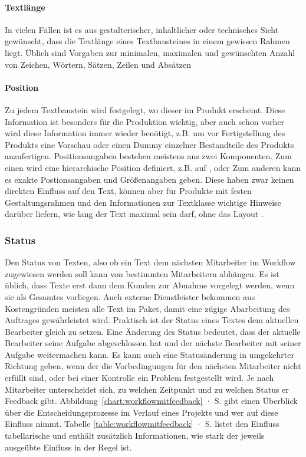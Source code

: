 \paragraph{Textlänge} In vielen Fällen ist es aus gestalterischer, inhaltlicher oder technisches Sicht gewünscht, dass die Textlänge eines Textbausteines in einem gewissen Rahmen liegt. Üblich sind Vorgaben zur minimalen, maximalen und gewünschten Anzahl von Zeichen, Wörtern, Sätzen, Zeilen und Absätzen

\paragraph{Position} Zu jedem Textbaustein wird festgelegt, wo dieser im Produkt erscheint. Diese Information ist besonders für die Produktion wichtig, aber auch schon vorher wird diese Information immer wieder benötigt, z.B. um vor Fertigstellung des Produkts eine Vorschau oder einen Dummy einzelner Bestandteile des Produkts anzufertigen. Positionsangaben bestehen meistens aus zwei Komponenten. Zum einen wird eine hierarchische Position definiert, z.B. auf , oder  Zum anderen kann es exakte Postionsangaben und Größenangaben geben. Diese haben zwar keinen direkten Einfluss auf den Text, können aber für Produkte mit festen Gestaltungsrahmen und den Informationen zur Textklasse wichtige Hinweise darüber liefern, wie lang der Text maximal sein darf, ohne das Layout .

\subsubsection{Status}\label{l:konzept-workflow-status}

Den Status von Texten, also ob ein Text dem nächsten Mitarbeiter im Workflow zugewiesen werden soll kann von bestimmten Mitarbeitern abhängen. Es ist üblich, dass Texte erst dann dem Kunden zur Abnahme vorgelegt werden, wenn sie als Gesamtes vorliegen. Auch externe Dienstleister bekommen aus Kostengründen meisten alle Text im Paket, damit eine zügige Abarbeitung des Auftrages gewährleistet wird. Praktisch ist der Status eines Textes dem aktuellen Bearbeiter gleich zu setzen. Eine Änderung des Status bedeutet, dass der aktuelle Bearbeiter seine Aufgabe abgeschlossen hat und der nächste Bearbeiter mit seiner Aufgabe weitermachen kann. Es kann auch eine Statusänderung in umgekehrter Richtung geben, wenn der die Vorbedingungen für den nächsten Mitarbeiter nicht erfüllt sind, oder bei einer Kontrolle ein Problem festgestellt wird. Je nach Mitarbeiter unterscheidet sich, zu welchen Zeitpunkt und zu welchen Status er Feedback gibt. Abbildung~\ref{chart:workflowmitfeedback} · S.\pageref{chart:workflowmitfeedback} gibt einen Überblick über die Entscheidungsprozesse im Verlauf eines Projekts und wer auf diese Einfluss nimmt. Tabelle \ref{table:workflowmitfeedback} · S.\pageref{table:workflowmitfeedback} listet den Einfluss tabellarische und enthält zusätzlich Informationen, wie stark der jeweils ausgeübte Einfluss in der Regel ist.

